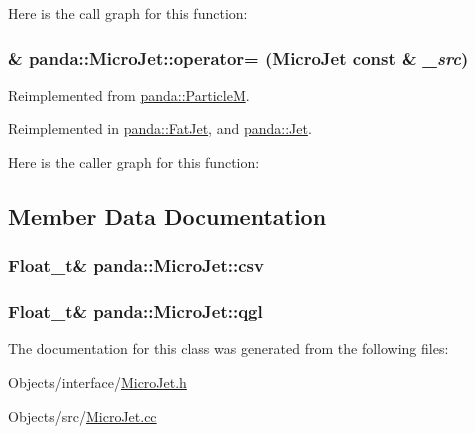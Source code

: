 Here is the call graph for this function:\hypertarget{classpanda_1_1MicroJet_a9375dd6d13362ae323e9915b529458e8}{
\subsubsection[{operator=}]{ \& panda::MicroJet::operator= ({\bf MicroJet} const \& {\em \_\-src})}}
\label{classpanda_1_1MicroJet_a9375dd6d13362ae323e9915b529458e8}


Reimplemented from \hyperlink{classpanda_1_1ParticleM_a37f7be4e1150b6080b47b005af730af5}{panda::ParticleM}.

Reimplemented in \hyperlink{classpanda_1_1FatJet_a20e4f6ca23c2a9a603c33e7f023337fe}{panda::FatJet}, and \hyperlink{classpanda_1_1Jet_a06509e069beffe7d5fa12a5450254e6a}{panda::Jet}.

Here is the caller graph for this function:

\subsection{Member Data Documentation}
\hypertarget{classpanda_1_1MicroJet_ae32a258d87814bab374481de01985cd0}{
\subsubsection[{csv}]{\setlength{\rightskip}{0pt plus 5cm}Float\_\-t\& {\bf panda::MicroJet::csv}}}
\label{classpanda_1_1MicroJet_ae32a258d87814bab374481de01985cd0}
\hypertarget{classpanda_1_1MicroJet_a304908e12a2567603ad7cb09c86205b4}{
\subsubsection[{qgl}]{\setlength{\rightskip}{0pt plus 5cm}Float\_\-t\& {\bf panda::MicroJet::qgl}}}
\label{classpanda_1_1MicroJet_a304908e12a2567603ad7cb09c86205b4}


The documentation for this class was generated from the following files:\begin{DoxyCompactItemize}
\item 
Objects/interface/\hyperlink{MicroJet_8h}{MicroJet.h}\item 
Objects/src/\hyperlink{MicroJet_8cc}{MicroJet.cc}\end{DoxyCompactItemize}
